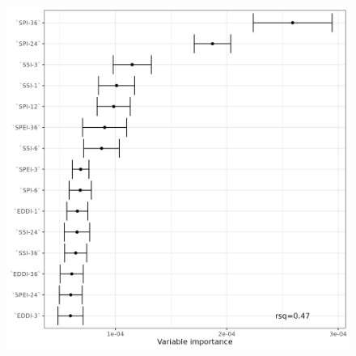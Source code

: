 \documentclass[
  authoryear,
  preprint,
  3p,
  onecolumn]{elsarticle}
\begin{document}
\begin{figure}[!ht]
\begin{minipage}{0.33\linewidth}
{\includegraphics[width=1\textwidth,height=\textheight]{../output/figs/fig_errorbar_resample_random_forest_trends_Shrubland.png}

}


\end{minipage}%
%
\begin{minipage}{0.33\linewidth}

\end{minipage}
\end{figure}
\end{document}
